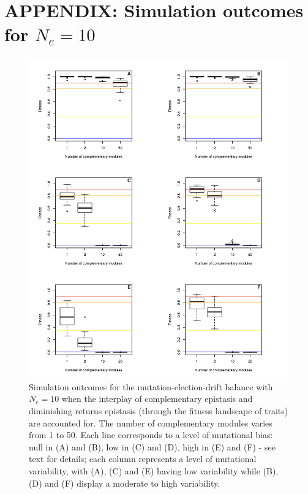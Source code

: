 \documentclass[11pt,onecolumn]{article}
\begin{document}

\pagebreak

\section*{APPENDIX: Simulation outcomes for $N_e=10$}

\begin{figure}[h!]
    \centering
    \includegraphics[scale=0.75,trim=0cm 0cm 0cm 0cm,clip]{Evo_Outcomes_Ne10.jpeg}
    \caption{Simulation outcomes for the mutation-election-drift balance with $N_e=10$ when the interplay of complementary epistasis and diminishing returns epistasis (through the fitness landscape of traits) are accounted for. The number of complementary modules varies from 1 to 50. Each line corresponds to a level of mutational bias: null in (A) and (B), low in (C) and (D), high in (E) and (F) - see text for details; each column represents a level of mutational variability, with (A), (C) and (E) having low variability while (B), (D) and (F) display a moderate to high variability.}
    \label{fig:Outcomes10}
\end{figure}
\end{document}
